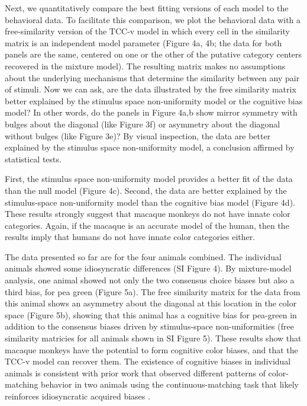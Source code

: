 Next, we quantitatively compare the best fitting versions of each model to the behavioral data. To facilitate this comparison, we plot the behavioral data with a free-similarity version of the TCC-v model in which every cell in the similarity matrix is an independent model parameter (Figure 4a, 4b; the data for both panels are the same, centered on one or the other of the putative category centers recovered in the mixture model). The resulting matrix makes no assumptions about the underlying mechanisms that determine the similarity between any pair of stimuli. Now we can ask, are the data illustrated by the free similarity matrix better explained by the stimulus space non-uniformity model or the cognitive bias model? In other words, do the panels in Figure 4a,b show mirror symmetry with bulges about the diagonal (like Figure 3f) or asymmetry about the diagonal without bulges (like Figure 3e)? By visual inspection, the data are better explained by the stimulus space non-uniformity model, a conclusion affirmed by statistical tests. 

First, the stimulus space non-uniformity model provides a better fit of the data than the null model (Figure 4c). Second, the data are better explained by the stimulus-space non-uniformity model than the cognitive bias model (Figure 4d). These results strongly suggest that macaque monkeys do not have innate color categories. Again, if the macaque is an accurate model of the human, then the results imply that humans do not have innate color categories either. 

The data presented so far are for the four animals combined. The individual animals showed some idiosyncratic differences (SI Figure 4). By mixture-model analysis, one animal showed not only the two consensus choice biases but also a third bias, for pea green (Figure 5a). The free similarity matrix for the data from this animal shows an asymmetry about the diagonal at this location in the color space (Figure 5b), showing that this animal has a cognitive bias for pea-green in addition to the consensus biases driven by stimulus-space non-uniformities (free similarity matricies for all animals shown in SI Figure 5). These results show that macaque monkeys have the potential to form cognitive color biases, and that the TCC-v model can recover them. The existence of cognitive biases in individual animals is consistent with prior work that observed different patterns of color-matching behavior in two animals using the continuous-matching task that likely reinforces idiosyncratic acquired biases \citep{panichello_error-correcting_2019}.


